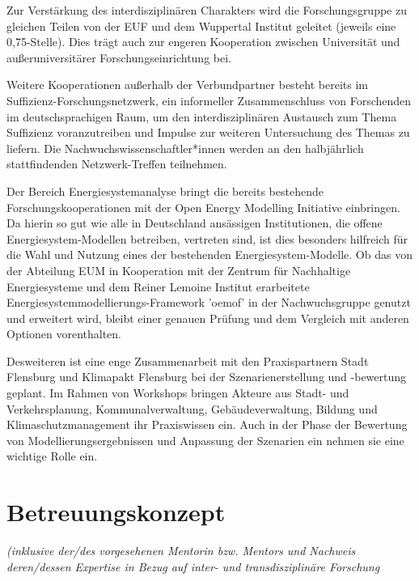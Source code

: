 \documentclass[a4paper,11pt,twoside]{scrartcl}
\begin{document}
Zur Verstärkung des interdisziplinären Charakters wird die Forschungsgruppe zu gleichen Teilen von der EUF und dem Wuppertal Institut geleitet (jeweils eine 0,75-Stelle). Dies trägt auch zur engeren Kooperation zwischen Universität und außeruniversitärer Forschungseinrichtung bei.

Weitere Kooperationen außerhalb der Verbundpartner besteht bereits im Suffizienz-Forschungsnetzwerk, ein informeller Zusammenschluss von Forschenden im deutschsprachigen Raum, um den interdisziplinären Austausch zum Thema Suffizienz voranzutreiben und Impulse zur weiteren Untersuchung des Themas zu liefern. Die Nachwuchswissenschaftler*innen werden an den halbjährlich stattfindenden Netzwerk-Treffen teilnehmen.

Der Bereich Energiesystemanalyse bringt die bereits bestehende Forschungskooperationen mit der Open Energy Modelling Initiative \cite{}
einbringen. Da hierin so gut wie alle in Deutschland ansässigen Institutionen, die offene Energiesystem-Modellen betreiben, vertreten sind, ist dies besonders hilfreich für die Wahl und Nutzung eines der bestehenden Energiesystem-Modelle. Ob das von der Abteilung EUM in Kooperation mit der Zentrum für Nachhaltige Energiesysteme und dem Reiner Lemoine Institut erarbeitete Energiesystemmodellierungs-Framework 'oemof' in der Nachwuchsgruppe genutzt und erweitert wird, bleibt einer genauen Prüfung und dem Vergleich mit anderen Optionen vorenthalten. 




Desweiteren ist eine enge Zusammenarbeit mit den Praxispartnern Stadt Flensburg und Klimapakt Flensburg bei der Szenarienerstellung und -bewertung geplant. Im Rahmen von Workshops bringen Akteure aus Stadt- und Verkehrsplanung, Kommunalverwaltung, Gebäudeverwaltung, Bildung und Klimaschutzmanagement ihr Praxiswissen ein. Auch in der Phase der Bewertung von Modellierungsergebnissen und Anpassung der Szenarien ein nehmen sie eine wichtige Rolle ein.


\section{Betreuungskonzept}
\textit{(inklusive der/des vorgesehenen Mentorin bzw. Mentors und Nachweis deren/dessen Expertise in Bezug auf inter- und transdisziplinäre Forschung}
\end{document}
